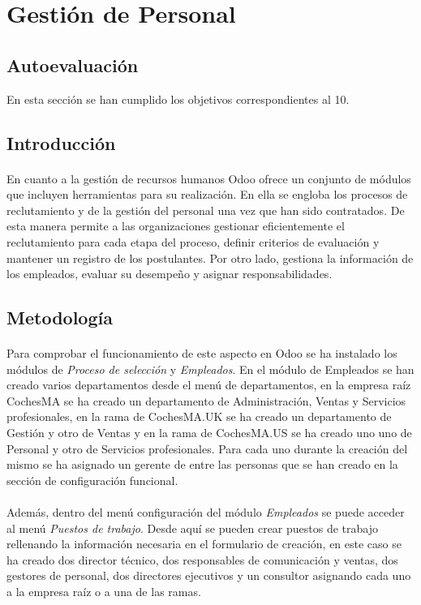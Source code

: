 \section{Gestión de Personal}
\subsection{Autoevaluación}
En esta sección se han cumplido los objetivos correspondientes al 10.
\subsection{Introducción}
\paragraph{}
En cuanto a la gestión de recursos humanos Odoo ofrece un conjunto de módulos que incluyen herramientas para su realización. En ella se engloba los procesos de reclutamiento y de la gestión del personal una vez que han sido contratados. De esta manera permite a las organizaciones gestionar eficientemente el reclutamiento para cada etapa del proceso, definir criterios de evaluación y mantener un registro de los postulantes. Por otro lado, gestiona la información de los empleados, evaluar su desempeño y asignar responsabilidades.
\subsection{Metodología}
\paragraph{}
Para comprobar el funcionamiento de este aspecto en Odoo se ha instalado los módulos de \textit{Proceso de selección} y \textit{Empleados}. En el módulo de Empleados se han creado varios departamentos desde el menú de departamentos, en la empresa raíz CochesMA se ha creado un departamento de Administración, Ventas y Servicios profesionales, en la rama de CochesMA.UK se ha creado un departamento de Gestión y otro de Ventas y en la rama de CochesMA.US se ha creado uno uno de Personal y otro de Servicios profesionales. Para cada uno durante la creación del mismo se ha asignado un gerente de entre las personas que se han creado en la sección de configuración funcional.
\paragraph{}
Además, dentro del menú configuración del módulo \textit{Empleados} se puede acceder al menú \textit{Puestos de trabajo}. Desde aquí se pueden crear puestos de trabajo rellenando la información necesaria en el formulario de creación, en este caso se ha creado dos director técnico, dos responsables de comunicación y ventas, dos gestores de personal, dos directores ejecutivos  y un consultor asignando cada uno a la empresa raíz o a una de las ramas. 
